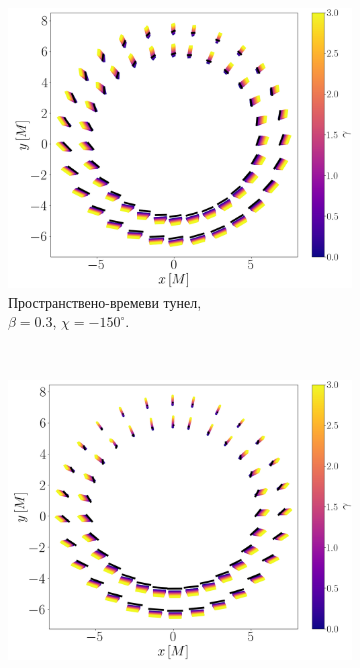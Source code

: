 \documentclass[12pt]{article}
\numberwithin{equation}{section}
\numberwithin{figure}{section}
\begin{document}
	
	\begin{figure}[!htb]
		\begin{subfigure}{7cm}
			\hspace{0.0em}
			\includegraphics[scale = 0.23]{Section_7_Polarized_Emission/WH_alpha_Vert_Field.png}
			\caption{Пространствено-времеви тунел, \\$\beta = 0.3$, $\chi = -150^\circ$.} 
		\end{subfigure}\,\,\,
		\begin{subfigure}{7cm}
			\hspace{0.2em}
			\includegraphics[scale = 0.23]{Section_7_Polarized_Emission/WH_alpha_Vert_Field_beta_zero.png}

\end{subfigure}
\end{figure}
\end{document}
